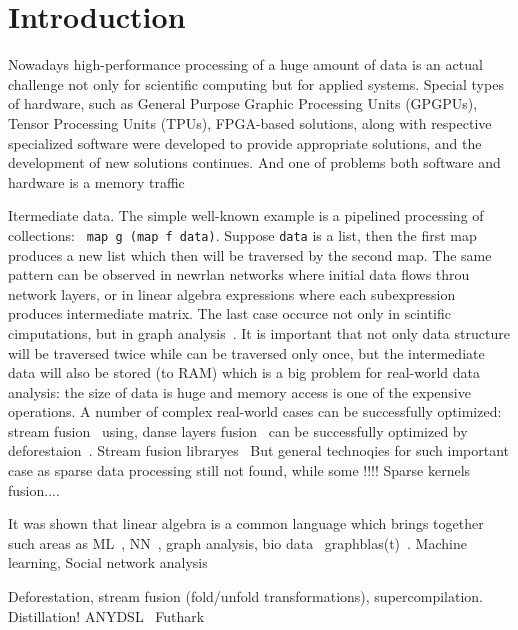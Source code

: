 \section{Introduction}

Nowadays high-performance processing of a huge amount of data is an actual challenge not only for scientific computing but for applied systems.
Special types of hardware, such as General Purpose Graphic Processing Units (GPGPUs), Tensor Processing Units (TPUs), FPGA-based solutions, along with respective specialized software were developed to provide appropriate solutions, and the development of new solutions continues. And one of problems both software and hardware is a memory traffic

Itermediate data. The simple well-known example is a pipelined processing of collections: \verb| map g (map f data)|. Suppose \verb|data| is a list, then the first map produces a new list which then will be traversed by the second map. The same pattern can be observed in newrlan networks where initial data flows throu network layers, or in linear algebra expressions where each subexpression produces intermediate matrix. The last case occurce not only in scintific cimputations, but in graph analysis~\cite{graphblast}. It is important that not only data structure will be traversed twice while can be traversed only once, but the intermediate data will also be stored (to RAM) which is a big problem for real-world data analysis: the size of data is huge and memory access is one of the expensive operations.
A number of complex real-world cases can be successfully optimized: stream fusion~\cite{} using, danse layers fusion~\cite{} can be successfully optimized by deforestaion~\cite{!!!}. Stream fusion libraryes~\cite{!!!} But general technoqies for such important case as sparse data processing still not found, while some !!!! Sparse kernels fusion....


It was shown that linear algebra is a common language which brings together such areas as 
ML~\cite{fusion-boosting-memory-computations}, NN~\cite{Kepner2017}, graph analysis, bio data~\cite{DBLP:conf/sc/SelvitopiEGPAB20} graphblas(t)~\cite{graphblast}.  Machine learning, Social network analysis


Deforestation, stream fusion (fold/unfold transformations), supercompilation. Distillation!
ANYDSL~\cite{!!!} Futhark~\cite{!!!}